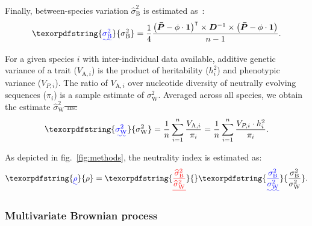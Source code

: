 \documentclass{article}
\newcommand{\Multiply}{\cdot}
\newcommand{\MultiplyMatrix}{\times}
\newcommand{\UniDimArray}[1]{\bm{#1}}
\newcommand{\BiDimArray}[1]{\bm{#1}}
\newcommand{\tr}{^{\intercal}}
\newcommand{\inv}{^{-1}}
\newcommand{\Spi}{i}
\newcommand{\NbrTaxa}{n}
\newcommand{\Trait}{P}
\newcommand{\Heritability}{h^2}
\newcommand{\VecTrait}{\UniDimArray{\bar{\Trait}}}
\newcommand{\RootTrait}{\phi}
\newcommand{\VecOne}{\UniDimArray{1}}
\newcommand{\Distance}{\BiDimArray{D}}
\newcommand{\DistanceMatrix}{\BiDimArray{\Distance}}
\newcommand{\VarGeneticSpi}{V_{\mathrm{A}, \Spi}}
\newcommand{\RateBetween}{\sigma^2_{\mathrm{B}}}
\newcommand{\RateWhithin}{\sigma^2_{\mathrm{W}}}
\newcommand{\EstRateBetween}{\widehat{\sigma}^2_{\mathrm{B}}}
\newcommand{\EstRateWhithin}{\widehat{\sigma}^2_{\mathrm{W}}}
\newcommand{\NI}{\rho}
\newcommand{\EstNI}{\widehat{\rho}}
\providecommand{\DIFaddtex}[1]{{\protect\color{blue}\uwave{#1}}} %
\providecommand{\DIFdeltex}[1]{{\protect\color{red}\sout{#1}}}                      %
\providecommand{\DIFaddbegin}{} %
\providecommand{\DIFaddend}{} %
\providecommand{\DIFdelbegin}{} %
\providecommand{\DIFdelend}{} %
\providecommand{\DIFadd}[1]{\texorpdfstring{\DIFaddtex{#1}}{#1}} %
\providecommand{\DIFdel}[1]{\texorpdfstring{\DIFdeltex{#1}}{}} %
\newcommand{\DIFscaledelfig}{0.5}
\newlength{\DIFdelgraphicswidth} %
\newlength{\DIFdelgraphicsheight} %
\newcommand{\DIFaddincludegraphics}[2][]{{\color{blue}\fbox{\DIFOincludegraphics[#1]{#2}}}} %
\newcommand{\DIFdelincludegraphics}[2][]{%
\sbox{\DIFdelgraphicsbox}{\DIFOincludegraphics[#1]{#2}}%
\settoboxwidth{\DIFdelgraphicswidth}{\DIFdelgraphicsbox} %
\settoboxtotalheight{\DIFdelgraphicsheight}{\DIFdelgraphicsbox} %
\scalebox{\DIFscaledelfig}{%
\parbox[b]{\DIFdelgraphicswidth}{\usebox{\DIFdelgraphicsbox}\\[-\baselineskip] \rule{\DIFdelgraphicswidth}{0em}}\llap{\resizebox{\DIFdelgraphicswidth}{\DIFdelgraphicsheight}{%
\setlength{\unitlength}{\DIFdelgraphicswidth}%
\begin{picture}(1,1)%
\thicklines\linethickness{2pt} %
{\color[rgb]{1,0,0}\put(0,0){\framebox(1,1){}}}%
{\color[rgb]{1,0,0}\put(0,0){\line( 1,1){1}}}%
{\color[rgb]{1,0,0}\put(0,1){\line(1,-1){1}}}%
\end{picture}%
}\hspace*{3pt}}} %
} %
\DeclareRobustCommand{\DIFaddbegin}{\DIFOaddbegin \let\includegraphics\DIFaddincludegraphics} %
\DeclareRobustCommand{\DIFaddend}{\DIFOaddend \let\includegraphics\DIFOincludegraphics} %
\DeclareRobustCommand{\DIFdelbegin}{\DIFOdelbegin \let\includegraphics\DIFdelincludegraphics} %
\DeclareRobustCommand{\DIFdelend}{\DIFOaddend \let\includegraphics\DIFOincludegraphics} %
\begin{document}
Finally, between-species variation \DIFdelbegin \DIFdel{$\EstRateBetween$ }\DIFdelend \DIFaddbegin \DIFadd{$\RateBetween$ }\DIFaddend is estimated as~\citep{omeara_testing_2006}:
\begin{gather}
    \DIFdelbegin %
\DIFdelend \DIFaddbegin \DIFadd{\RateBetween }\DIFaddend = \frac{1}{4}\frac{\left( \VecTrait -  \RootTrait \Multiply \VecOne \right)\tr \MultiplyMatrix \DistanceMatrix\inv \MultiplyMatrix \left( \VecTrait -  \RootTrait \Multiply \VecOne  \right)}{\NbrTaxa - 1}. \label{eq:estimated-rate-phy}
\end{gather}

For a given species $\Spi$ with inter-individual data available, additive genetic variance of a trait ($\VarGeneticSpi$) is the product of heritability ($\Heritability_{i}$) and phenotypic variance ($V_{\Trait, i}$).
The ratio of $\VarGeneticSpi$ over nucleotide diversity of neutrally evolving sequences ($\pi_{\Spi}$) is a sample estimate of $\RateWhithin$.
Averaged across all species, we obtain the estimate \DIFdelbegin \DIFdel{$\EstRateWhithin$ as:
}\DIFdelend \DIFaddbegin \DIFadd{$\RateWhithin$ as:
}\DIFaddend \begin{gather}
    \DIFdelbegin %
\DIFdelend \DIFaddbegin \DIFadd{\RateWhithin }\DIFaddend = \dfrac{1}{\NbrTaxa}\sum_{i=1}^{\NbrTaxa}\frac{  \VarGeneticSpi}{ \pi_{i}} = \dfrac{1}{\NbrTaxa}\sum_{i=1}^{\NbrTaxa} \frac{  V_{\Trait, i} \Multiply \Heritability_{i}}{ \pi_{i}}. \label{eq:estimated-rate-pop}
\end{gather}

As depicted in fig.~\ref{fig:methods}, the neutrality index is estimated as:
\begin{gather}
    \DIFdelbegin %
\DIFdelend \DIFaddbegin \DIFadd{\NI }\DIFaddend = \DIFdelbegin \DIFdel{\frac{\EstRateBetween}{\EstRateWhithin}}\DIFdelend \DIFaddbegin \DIFadd{\frac{\RateBetween}{\RateWhithin}}\DIFaddend . \label{eq:estimated-NI}
\end{gather}

\subsubsection*{Multivariate Brownian process}
\end{document}
